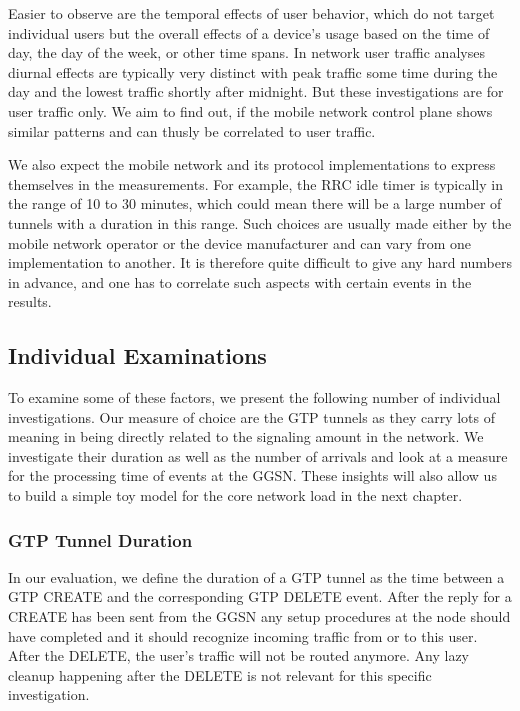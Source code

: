 Easier to observe are the temporal effects of user behavior, which do not target individual users but the overall effects of a device's usage based on the time of day, the day of the week, or other time spans. In network user traffic analyses diurnal effects are typically very distinct with peak traffic some time during the day and the lowest traffic shortly after midnight. But these investigations are for user traffic only. We aim to find out, if the mobile network control plane shows similar patterns and can thusly be correlated to user traffic.

We also expect the mobile network and its protocol implementations to express themselves in the measurements. For example, the \ac{RRC} idle timer is typically in the range of 10 to 30 minutes, which could mean there will be a large number of tunnels with a duration in this range. Such choices are usually made either by the mobile network operator or the device manufacturer and can vary from one implementation to another. It is therefore quite difficult to give any hard numbers in advance, and one has to correlate such aspects with certain events in the results.



\subsection{Individual Examinations}

To examine some of these factors, we present the following number of individual investigations. Our measure of choice are the GTP tunnels as they carry lots of meaning in being directly related to the signaling amount in the network. We investigate their duration as well as the number of arrivals and look at a measure for the processing time of events at the GGSN. These insights will also allow us to build a simple toy model for the core network load in the next chapter.


\subsubsection{GTP Tunnel Duration}

In our evaluation, we define the duration of a GTP tunnel as the time between a GTP CREATE and the corresponding GTP DELETE event. After the reply for a CREATE has been sent from the \ac{GGSN} any setup procedures at the node should have completed and it should recognize incoming traffic from or to this user. After the DELETE, the user's traffic will not be routed anymore. Any lazy cleanup happening after the DELETE is not relevant for this specific investigation.

